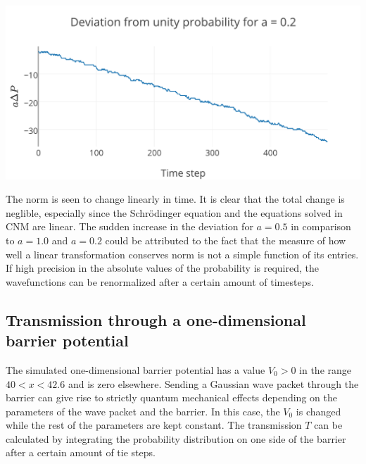 \begin{Figure}
    \centering
    \includegraphics[width=\linewidth]{norma02.pdf}
    \label{fig:distancea02_2}
\end{Figure} The norm is seen to change linearly in time. It is clear that the total change is neglible, especially since the Schr\"{o}dinger equation and the equations solved in CNM are linear. The sudden increase in the deviation for $a=0.5$ in comparison to $a=1.0$ and $a=0.2$ could be attributed to the fact that the measure of how well a linear transformation conserves norm is not a simple function of its entries. If high precision in the absolute values of the probability is required, the wavefunctions can be renormalized after a certain amount of timesteps.

\subsection*{Transmission through a one-dimensional barrier potential}
The simulated one-dimensional barrier potential has a value $V_0>0$ in the range $40<x<42.6$ and is zero elsewhere. Sending a Gaussian wave packet through the barrier can give rise to strictly quantum mechanical effects depending on the parameters of the wave packet and the barrier. In this case, the $V_0$ is changed while the rest of the parameters are kept constant. The transmission $T$ can be calculated by integrating the probability distribution on one side of the barrier after a certain amount of tie steps.
